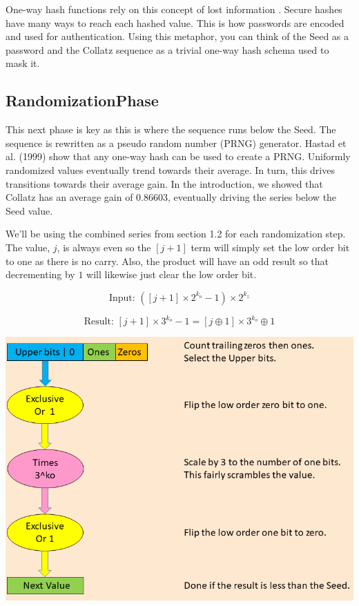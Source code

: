 \documentclass[letterpaper]{article}
\begin{document}
\begin{multicols}{2}
One-way hash functions rely on this concept of lost information \cite{3}. Secure hashes have many ways to reach each hashed value. This is how passwords are encoded and used for authentication. Using this metaphor, you can think of the Seed as a password and the Collatz sequence as a trivial one-way hash schema used to mask it.

\subsection{RandomizationPhase}

This next phase is key as this is where the sequence runs below the Seed. The sequence is rewritten as a pseudo random number (PRNG) generator. Hastad et al. (1999) \cite{4} show that any one-way hash can be used to create a PRNG. Uniformly randomized values eventually trend towards their average. In turn, this drives transitions towards their average gain. In the introduction, we showed that Collatz has an average gain of $0.86603$, eventually driving the series below the Seed value.

We'll be using the combined series from section 1.2 for each randomization step. The value, $j$, is always even so the $[j + 1]$ term will simply set the low order bit to one as there is no carry. Also, the product will have an odd result so that decrementing by $1$ will likewise just clear the low order bit.

\[
\text{Input: } ([j + 1] \times 2^{k_o} - 1) \times 2^{k_z}
\]

\[
\text{Result: } [j + 1] \times 3^{k_o} - 1 = [j \oplus 1] \times 3^{k_o} \oplus 1
\]



\begin{center}
\includegraphics[width=\textwidth]{collatz_even}
\end{center}


\end{multicols}
\end{document}
